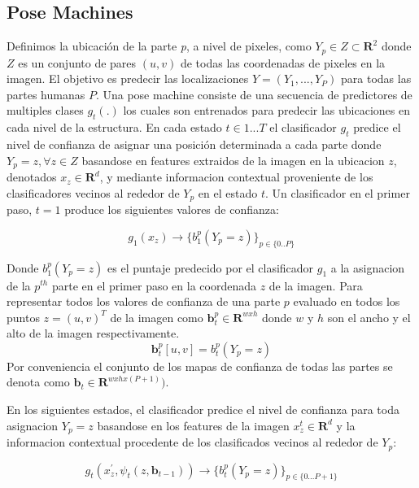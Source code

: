 \documentclass[runningheads]{llncs}
\begin{document}
\subsection{Pose Machines}

Definimos la ubicación de la parte \textit{p}, a nivel de pixeles, como $Y_{\textit{p}} \in Z \subset \mathbf{R}^{2}$ donde $Z$ es un conjunto de pares $(u,v)$ de todas las coordenadas de pixeles en la imagen. El objetivo es predecir las localizaciones $ Y = (Y_{1},..., Y_{\textit{P}}) $ para todas las partes humanas $P$. Una pose machine consiste de una secuencia de predictores de multiples clases $g_{t}(.)$ los cuales son entrenados para predecir las ubicaciones en cada nivel de la estructura. En cada estado $t \in {1...T}$ el clasificador $g_{t}$ predice el nivel de confianza de asignar una posición determinada a cada parte  donde $Y_{\textit{p}} = z, \forall z \in Z$ basandose en features extraidos de la imagen en la ubicacion $z$, denotados $ x_{z} \in \mathbf{R}^{d}$, y mediante informacion contextual proveniente de los clasificadores vecinos al rededor de $Y_{\textit{p}}$ en el estado $t$.
Un clasificador en el primer paso, $t= 1$ produce los siguientes valores de confianza:

\begin{equation}
g_{1}(x_{z}) \rightarrow \{ b_{1}^p(Y_{p} = z) \}_{p \in \{0..P\}}
\end{equation}

Donde $ b_{1}^p(Y_{p} = z)$ es el puntaje predecido por el clasificador $g_1$ a la asignacion de la $p^{th}$ parte en el primer paso en la coordenada $z$ de la imagen. Para representar todos los valores de confianza de una parte $p$ evaluado en todos los puntos $z=(u,v)^T$ de la imagen como $\textbf{b}_t^p \in \mathbf{R}^{wxh}$ donde $w$ y $h$ son el ancho y el alto de la imagen respectivamente.
\begin{equation}
\textbf{b}_t^p[u,v]= b_t^p(Y_p = z)
\end{equation}
Por conveniencia el conjunto de los mapas de confianza de todas las partes se denota como $\textbf{b}_t \in \mathbf{R}^{wxhx(P+1)})$.

En los siguientes estados, el clasificador predice el nivel de confianza para toda asignacion $Y_p = z$ basandose en los features de la imagen $x_z^t \in \mathbf{R}^d$ y la informacion contextual procedente de los clasificados vecinos al rededor de $Y_p$:

\begin{equation}
g_t(x_z^{'}, \psi_t(z,\textbf{b}_{t-1})) \rightarrow \{ b_t^p(Y_p = z)  \}_{p \in \{0...P+1 \}}
\end{equation}
\end{document}
